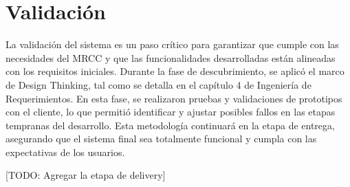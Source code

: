 \section{Validación}\label{sec:validacion}

La validación del sistema es un paso crítico para garantizar que cumple con las necesidades del MRCC y que las funcionalidades desarrolladas 
están alineadas con los requisitos iniciales. Durante la fase de descubrimiento, se aplicó el marco de Design Thinking, tal como se detalla 
en el capítulo 4 de Ingeniería de Requerimientos. En esta fase, se realizaron pruebas y validaciones de prototipos con el cliente, lo que 
permitió identificar y ajustar posibles fallos en las etapas tempranas del desarrollo. Esta metodología continuará en la etapa de entrega, 
asegurando que el sistema final sea totalmente funcional y cumpla con las expectativas de los usuarios.

[TODO: Agregar la etapa de delivery]